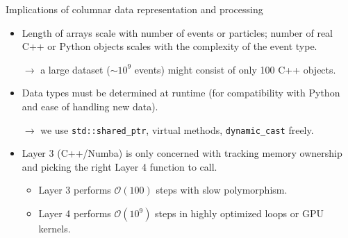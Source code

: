 \documentclass[aspectratio=169]{beamer}
\begin{document}
\begin{frame}{Implications of columnar data representation and processing}
\large
\vspace{0.5 cm}
\begin{itemize}\setlength{\itemsep}{0.6 cm}
\item Length of arrays scale with number of events or particles; number of real C++ or Python objects scales with the complexity of the event type.

\vspace{0.2 cm}
$\rightarrow$ a large dataset ($\sim 10^9$ events) might consist of only 100 C++ objects.

\item Data types must be determined at runtime (for compatibility with Python and ease of handling new data).

\vspace{0.2 cm}
$\rightarrow$ we use \texttt{std::shared_ptr}, virtual methods, \texttt{dynamic_cast} freely.

\item Layer 3 (C++/Numba) is only concerned with tracking memory ownership and picking the right Layer 4 function to call.

\begin{itemize}
\item \large Layer 3 performs $\mathcal{O}(100)$ steps with slow polymorphism.
\item \large Layer 4 performs $\mathcal{O}(10^9)$ steps in highly optimized loops or GPU kernels.
\end{itemize}
\end{itemize}
\end{frame}
\end{document}
